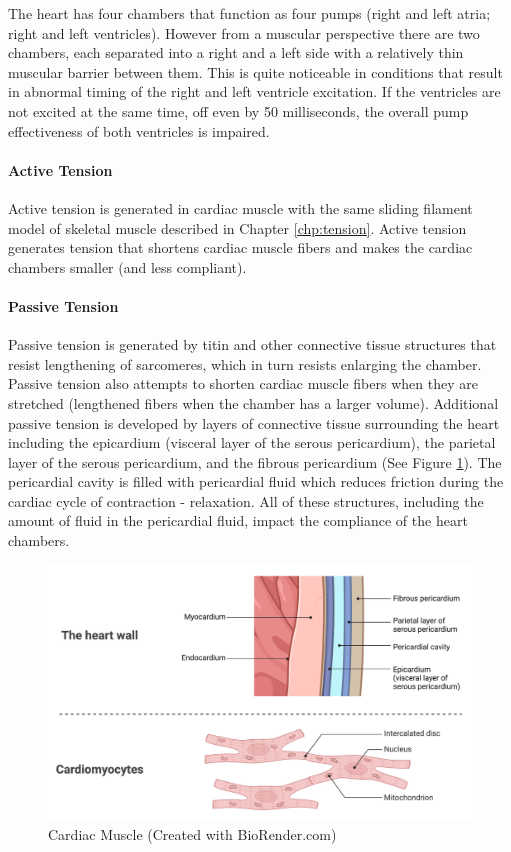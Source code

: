 The heart has four chambers that function as four pumps (right and left atria; right and left ventricles). However from a muscular perspective there are two chambers, each separated into a right and a left side with a relatively thin muscular barrier between them. This is quite noticeable in conditions that result in abnormal timing of the right and left ventricle excitation. If the ventricles are not excited at the same time, off even by 50 milliseconds, the overall pump effectiveness of both ventricles is impaired.

\paragraph{Active Tension}

Active tension is generated in cardiac muscle with the same sliding filament model of skeletal muscle described in Chapter \ref{chp:tension}. Active tension generates tension that shortens cardiac muscle fibers and makes the cardiac chambers smaller (and less compliant). 

\paragraph{Passive Tension}

Passive tension is generated by titin and other connective tissue structures that resist lengthening of sarcomeres, which in turn resists enlarging the chamber. Passive tension also attempts to shorten cardiac muscle fibers when they are stretched (lengthened fibers when the chamber has a larger volume). Additional passive tension is developed by layers of connective tissue surrounding the heart including the epicardium (visceral layer of the serous pericardium), the parietal layer of the serous pericardium, and the fibrous pericardium (See Figure \ref{fig:Cardiac_Muscle}). The pericardial cavity is filled with pericardial fluid which reduces friction during the cardiac cycle of contraction - relaxation. All of these structures, including the amount of fluid in the pericardial fluid, impact the compliance of the heart chambers.

\begin{figure}[!h]
    \centering
    \includegraphics[width=1\linewidth]{./figure/Cardiac_Muscle.png}
    \caption{Cardiac Muscle \footnotesize{(Created with BioRender.com)}}
    \label{fig:Cardiac_Muscle}
\end{figure}

